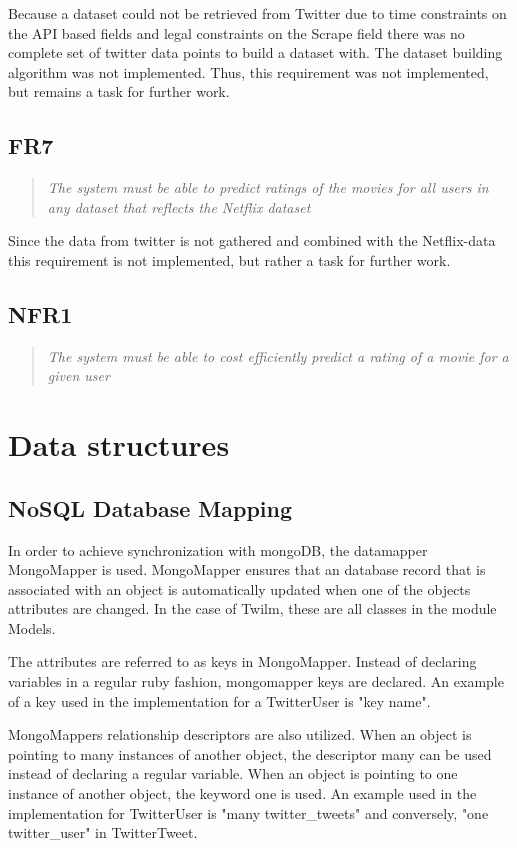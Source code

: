 Because a dataset could not be retrieved from Twitter due to time constraints on the API based fields and legal constraints on the Scrape field there was no complete set of twitter data points to build a dataset with. The dataset building algorithm was not implemented. Thus, this requirement was not implemented, but remains a task for further work.

\subsection{FR7}
\begin{quotation}
\em The system must be able to predict ratings of the movies for all users in any dataset that reflects the Netflix dataset %
\end{quotation}

Since the data from twitter is not gathered and combined with the Netflix-data this requirement is not implemented, but rather a task for further work.

\subsection{NFR1}
\begin{quotation}
\em The system must be able to cost efficiently predict a rating of a movie for a given user %
\end{quotation}


\section{Data structures}\label{impl:Data structures}
\subsection{NoSQL Database Mapping}
In order to achieve synchronization with mongoDB, the datamapper MongoMapper is used. MongoMapper ensures that an database record that is associated with an object is automatically updated when one of the objects attributes are changed. In the case of Twilm, these are all classes in the module Models.

The attributes are referred to as keys in MongoMapper. Instead of declaring variables in a regular ruby fashion, mongomapper keys are declared. An example of a key used in the implementation for a TwitterUser is "key name".

MongoMappers relationship descriptors are also utilized. When an object is pointing to many instances of another object, the descriptor many can be used instead of declaring a regular variable. When an object is pointing to one instance of another object, the keyword one is used. An example used in the implementation for TwitterUser is "many twitter\_tweets" and conversely, "one twitter\_user" in TwitterTweet.

